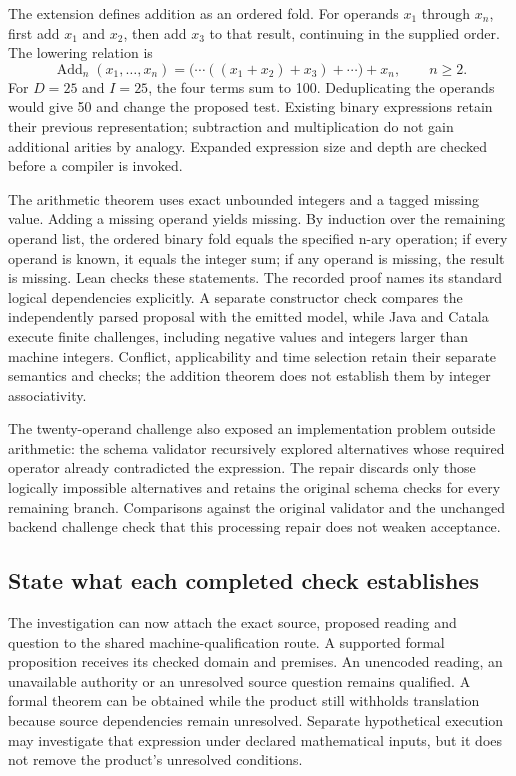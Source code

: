 \documentclass[12pt,a4paper,oneside,openany]{book}
\begin{document}
The extension defines addition as an ordered fold. For operands $x_1$ through
$x_n$, first add $x_1$ and $x_2$, then add $x_3$ to that result, continuing in
the supplied order. The lowering relation is
\begin{equation}
  \operatorname{Add}_n(x_1,\ldots,x_n)
  = \bigl(\cdots((x_1+x_2)+x_3)+\cdots\bigr)+x_n,
  \qquad n\geq 2.
  \label{eq:continuation-ordered-addition}
\end{equation}
For $D=25$ and $I=25$, the four terms sum to 100. Deduplicating the operands
would give 50 and change the proposed test. Existing binary expressions retain
their previous representation; subtraction and multiplication do not gain
additional arities by analogy. Expanded expression size and depth are checked
before a compiler is invoked.

The arithmetic theorem uses exact unbounded integers and a tagged missing
value. Adding a missing operand yields missing. By induction over the remaining
operand list, the ordered binary fold equals the specified n-ary operation;
if every operand is known, it equals the integer sum; if any operand is missing,
the result is missing. Lean checks these statements. The recorded proof names
its standard logical dependencies explicitly. A separate constructor check
compares the independently parsed proposal with the emitted model, while Java
and Catala execute finite challenges, including negative values and integers
larger than machine integers. Conflict, applicability and time selection retain
their separate semantics and checks; the addition theorem does not establish
them by integer associativity.

The twenty-operand challenge also exposed an implementation problem outside
arithmetic: the schema validator recursively explored alternatives whose
required operator already contradicted the expression. The repair discards
only those logically impossible alternatives and retains the original schema
checks for every remaining branch. Comparisons against the original validator
and the unchanged backend challenge check that this processing repair does not
weaken acceptance.

\subsection{State what each completed check establishes}

The investigation can now attach the exact source, proposed reading and
question to the shared machine-qualification route. A supported formal
proposition receives its checked domain and premises. An unencoded reading, an
unavailable authority or an unresolved source question remains qualified. A
formal theorem can be obtained while the product still withholds translation
because source dependencies remain unresolved. Separate hypothetical execution
may investigate that expression under declared mathematical inputs, but it
does not remove the product's unresolved conditions.
\end{document}
